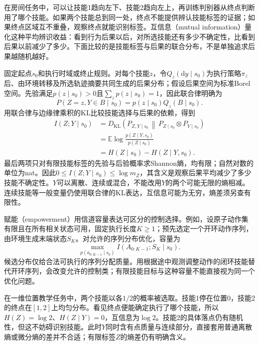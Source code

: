 在房间任务中，可以让技能1趋向左下、技能2趋向左上，再训练判别器从终点判断用了哪个技能。如果两个技能总到同一处，终点不能提供辨认技能标签的证据；如果终点区域互不重叠，观察终点就能识别标签。互信息（mutual information）量化这种平均辨识收益：看到行为后果以后，对所选技能还有多少不确定性，比看到后果以前减少了多少。下面比较的是技能标签与后果的联合分布，不是单独追求后果越随机越好。

固定起点$s_0$和执行时域或终止规则。对每个技能$z$，令$Q_z(\mathrm dy\mid s_0)$为执行策略$\pi_z$后、由环境转移及所选轨迹摘要共同生成的后果分布；假设后果空间为标准Borel空间。先验满足$p(z\mid s_0)>0$且$\sum_zp(z\mid s_0)=1$，因此联合律明确为
\[
 P(Z=z,Y\in B\mid s_0)=p(z\mid s_0)Q_z(B\mid s_0).
\]
用联合律与边缘律乘积的KL比较技能选择与后果的依赖，得到
\[
 \begin{aligned}
 I(Z;Y\mid s_0)
 &=D_{\mathrm{KL}}\!\left(P_{Z,Y\mid s_0}\,\middle\|\,
          P_{Z\mid s_0}\otimes P_{Y\mid s_0}\right)\\
 &=\mathbb E\log\frac{p(Z\mid Y,s_0)}{p(Z\mid s_0)}\\
 &=H(Z\mid s_0)-H(Z\mid Y,s_0).
 \end{aligned}
\]
最后两项只对有限技能标签的先验与后验概率求Shannon熵，均有限；自然对数的单位为nat。因此$0\leq I(Z;Y\mid s_0)\leq\log m_Z$，其含义是观察后果平均减少了多少技能不确定性。$Y$可以离散、连续或混合，不能改用$Y$的两个可能无限的熵相减。连续技能等一般变量仍使用联合律的KL表达，互信息可能为无穷，熵差须另查有限性。

赋能（empowerment）用信道容量表达可区分的控制选择。例如，设原子动作集有限且在所有相关状态可用，固定执行长度$K\geq1$；预先选定一个开环动作序列，由环境生成末端状态$S_K$。对允许的序列分布优化，容量为
\[
 \max_{p(a_{0:K-1}\mid s_0)}
       I(A_{0:K-1};S_K\mid s_0).
\]
候选分布仅给合法可执行的序列分配质量。用根据途中观测调整动作的闭环技能替代开环序列，会改变允许的控制类；有限技能目标与这种容量不能直接视为同一个优化问题。

\begin{example}
  \label{ex:rl-learning-finite-skill-mi}
  在一维位置教学任务中，两个技能以各$1/2$的概率被选取。技能1停在位置0，技能2的终点在$[1,2]$上均匀分布。看见终点便能确定执行了哪个技能，所以$H(Z)=\log2$、$H(Z\mid Y)=0$，互信息为$\log2$。技能2的具体落点仍有随机性，但这不妨碍识别技能。此时$Y$同时含有点质量与连续部分，直接套用普通离散熵或微分熵的差并不合适；有限标签$Z$的熵差仍有明确含义。
\end{example}

